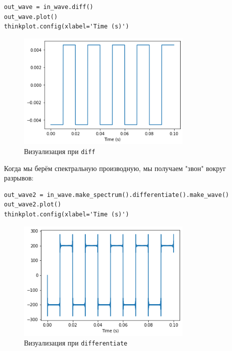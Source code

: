 \documentclass[a4paper,12pt]{report}
\begin{document}
\begin{lstlisting}[caption=Визуализация при \texttt{diff}]
out_wave = in_wave.diff()
out_wave.plot()
thinkplot.config(xlabel='Time (s)')
\end{lstlisting}

\begin{figure}[H]
        \centering
        \includegraphics[width=0.75\textwidth]{lab9_fig2_2.png}
        \caption{Визуализация при \texttt{diff}}
        \label{fig:lab9_fig2_2}
\end{figure}

Когда мы берём спектральную производную, мы получаем "звон" вокруг разрывов:

\begin{lstlisting}[caption=Визуализация при \texttt{differentiate}]
out_wave2 = in_wave.make_spectrum().differentiate().make_wave()
out_wave2.plot()
thinkplot.config(xlabel='Time (s)')
\end{lstlisting}

\begin{figure}[H]
        \centering
        \includegraphics[width=0.75\textwidth]{lab9_fig2_3.png}
        \caption{Визуализация при \texttt{differentiate}}
        \label{fig:lab9_fig2_3}
\end{figure}
\end{document}

